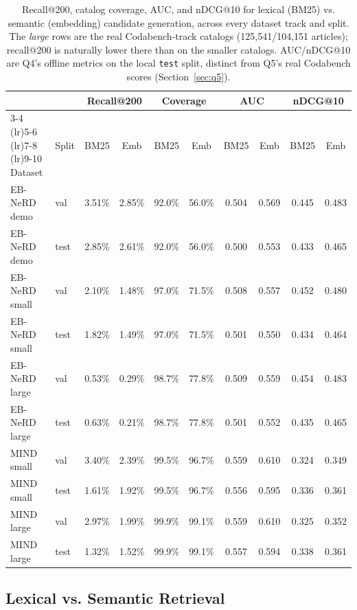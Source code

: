 \documentclass[11pt]{article}
\begin{document}
\begin{table}[h]
\centering
\scriptsize
\setlength{\tabcolsep}{3pt}
\renewcommand{\arraystretch}{0.95}
\begin{tabular}{ll cc cc cc cc}
\toprule
& & \multicolumn{2}{c}{Recall@200} & \multicolumn{2}{c}{Coverage} & \multicolumn{2}{c}{AUC} & \multicolumn{2}{c}{nDCG@10} \\
\cmidrule(lr){3-4} \cmidrule(lr){5-6} \cmidrule(lr){7-8} \cmidrule(lr){9-10}
Dataset & Split & BM25 & Emb & BM25 & Emb & BM25 & Emb & BM25 & Emb \\
\midrule
EB-NeRD demo & val & 3.51\% & 2.85\% & 92.0\% & 56.0\% & 0.504 & 0.569 & 0.445 & 0.483 \\
EB-NeRD demo & test & 2.85\% & 2.61\% & 92.0\% & 56.0\% & 0.500 & 0.553 & 0.433 & 0.465 \\
EB-NeRD small & val & 2.10\% & 1.48\% & 97.0\% & 71.5\% & 0.508 & 0.557 & 0.452 & 0.480 \\
EB-NeRD small & test & 1.82\% & 1.49\% & 97.0\% & 71.5\% & 0.501 & 0.550 & 0.434 & 0.464 \\
EB-NeRD large & val & 0.53\% & 0.29\% & 98.7\% & 77.8\% & 0.509 & 0.559 & 0.454 & 0.483 \\
EB-NeRD large & test & 0.63\% & 0.21\% & 98.7\% & 77.8\% & 0.501 & 0.552 & 0.435 & 0.465 \\
MIND small & val & 3.40\% & 2.39\% & 99.5\% & 96.7\% & 0.559 & 0.610 & 0.324 & 0.349 \\
MIND small & test & 1.61\% & 1.92\% & 99.5\% & 96.7\% & 0.556 & 0.595 & 0.336 & 0.361 \\
MIND large & val & 2.97\% & 1.99\% & 99.9\% & 99.1\% & 0.559 & 0.610 & 0.325 & 0.352 \\
MIND large & test & 1.32\% & 1.52\% & 99.9\% & 99.1\% & 0.557 & 0.594 & 0.338 & 0.361 \\
\bottomrule
\end{tabular}
\caption{\small Recall@200, catalog coverage, AUC, and nDCG@10 for lexical (BM25) vs. semantic
(embedding) candidate generation, across every dataset track and split. The \emph{large} rows
are the real Codabench-track catalogs (125,541/104,151 articles); recall@200 is naturally lower
there than on the smaller catalogs. AUC/nDCG@10 are Q4's offline metrics on the local
\texttt{test} split, distinct from Q5's real Codabench scores (Section~\ref{sec:q5}).}
\label{tab:results}
\end{table}

\subsection{Lexical vs. Semantic Retrieval}
\label{sec:lexvssem}
\end{document}

